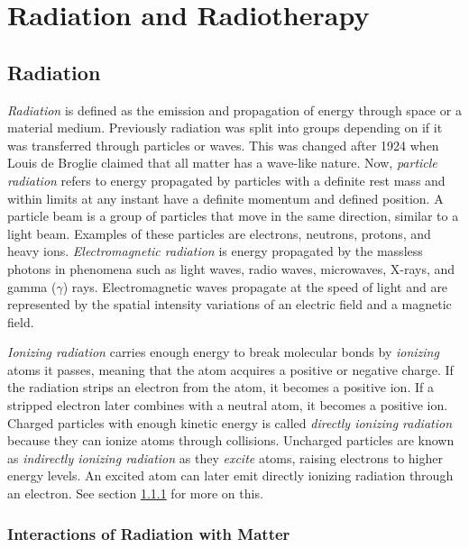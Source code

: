 \documentclass[../main/thesis.tex]{subfiles}
\begin{document}
\newpage

\chapter{Radiation and Radiotherapy}
\label{theory}
\section{Radiation}
\label{t-radiation}
\textit{Radiation} is defined as the emission and propagation of energy through space or a material medium. Previously radiation was split into groups depending on if it was transferred through particles or waves. This was changed after 1924 when Louis de Broglie claimed that all matter has a wave-like nature. Now, \textit{particle radiation} refers to energy propagated by particles with a definite rest mass and within limits at any instant have a definite momentum and defined position. A particle beam is a group of particles that move in the same direction, similar to a light beam. Examples of these particles are electrons, neutrons, protons, and heavy ions. \textit{Electromagnetic radiation} is energy propagated  by the massless photons in phenomena such as light waves, radio waves, microwaves, X-rays, and gamma ($\gamma$) rays. Electromagnetic waves propagate at the speed of light and are represented by the spatial intensity variations of an electric field and a magnetic field. \citep[chap. 1]{Khan} 

\textit{Ionizing radiation} carries enough energy to break molecular bonds by \textit{ionizing} atoms it passes, meaning that the atom acquires a positive or negative charge. If the radiation strips an electron from the atom, it becomes a positive ion. If a stripped electron later combines with a neutral atom, it becomes a positive ion. Charged particles with enough kinetic energy is called \textit{directly ionizing radiation} because they can ionize atoms through collisions. Uncharged particles are known as \textit{indirectly ionizing radiation} as they \textit{excite} atoms, raising electrons to higher energy levels. An excited atom can later emit directly ionizing radiation through an electron. \citep[chap. 5]{Khan} See section \ref{t-int} for more on this.




\subsection{Interactions of Radiation with Matter}
\label{t-int}
\end{document}
